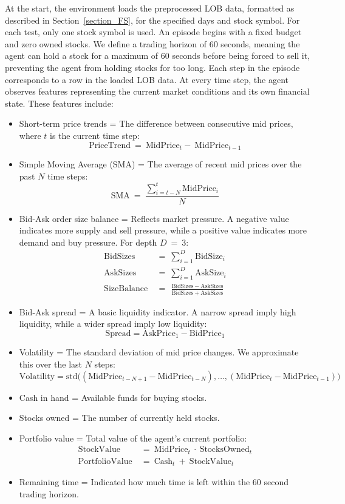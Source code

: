 \documentclass[a4paper,oneside,onecolumn,12pt]{book}
\begin{document}
	At the start, the environment loads the preprocessed LOB data, formatted as described in Section~\ref{section_FS}, for the specified days and stock symbol. For each test, only one stock symbol is used. An episode begins with a fixed budget and zero owned stocks. We define a trading horizon of 60 seconds, meaning the agent can hold a stock for a maximum of 60 seconds before being forced to sell it, preventing the agent from holding stocks for too long. Each step in the episode corresponds to a row in the loaded LOB data. At every time step, the agent observes features representing the current market conditions and its own financial state. These features include:
	\begin{itemize}
		\item Short-term price trends = The difference between consecutive mid prices, where $t$ is the current time step: 
			\[ \text{PriceTrend}\ =\ \text{MidPrice}_{t} -\ \text{MidPrice}_{t-1} \]
		\item Simple Moving Average (SMA) = The average of recent mid prices over the past $N$ time steps:
			\[ \text{SMA}\ =\ \frac{\sum_{i=t-N}^{t}{\text{MidPrice}_{i}}}{N} \]
		\item Bid-Ask order size balance = Reflects market pressure. A negative value indicates more supply and sell pressure, while a positive value indicates more demand and buy pressure. For depth $D\ =\ 3$:
			\begin{align*}
			\text{BidSizes}\ &=\ \sum_{i=1}^{D}{\text{BidSize}_i}\\
			\text{AskSizes}\ &=\ \sum_{i=1}^{D}{\text{AskSize}_i}\\
			\text{SizeBalance}\ &=\ \frac{\text{BidSizes}\ -\ \text{AskSizes}}{\text{BidSizes}\ +\ \text{AskSizes}}
			\end{align*}
		\item Bid-Ask spread = A basic liquidity indicator. A narrow spread imply high liquidity, while a wider spread imply low liquidity:
			\[ \text{Spread} = \text{AskPrice}_{1} - \text{BidPrice}_{1} \]
		\item Volatility = The standard deviation of mid price changes. We approximate this over the last $N$ steps:
			\[ \text{Volatility} = \mathrm{std}\big( (\text{MidPrice}_{t-N+1} - \text{MidPrice}_{t-N}), \ldots, (\text{MidPrice}_{t} - \text{MidPrice}_{t-1}) \big) \]
		\item Cash in hand = Available funds for buying stocks.
		\item Stocks owned = The number of currently held stocks.
		\item Portfolio value = Total value of the agent's current portfolio:
			\begin{align*}
			\text{StockValue}\ &=\ \text{MidPrice}_{t}\ \cdot\ \text{StocksOwned}_{t} \\
			\text{PortfolioValue}\ &=\ \text{Cash}_{t}\ +\ \text{StockValue}_{t}
			\end{align*}
		\item Remaining time = Indicated how much time is left within the 60 second trading horizon.
	\end{itemize}
\end{document}
